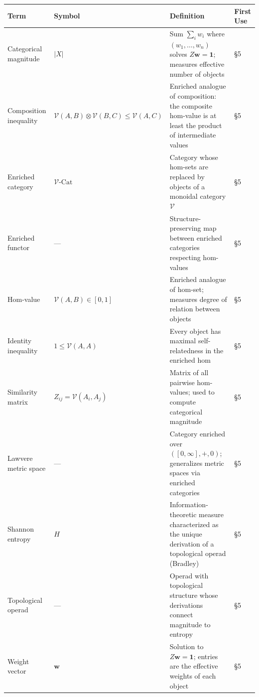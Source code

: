 \documentclass[
]{article}
\newcounter{none} %
\numberwithin{equation}{section}
\begin{document}
{\def\LTcaptype{none} %
\begin{longtable}[]{@{}
  >{\raggedright\arraybackslash}p{}
  >{\centering\arraybackslash}p{}
  >{\raggedright\arraybackslash}p{}
  >{\centering\arraybackslash}p{}@{}}
\toprule\noalign{}
\begin{minipage}[b]{\linewidth}\raggedright
Term
\end{minipage} & \begin{minipage}[b]{\linewidth}\centering
Symbol
\end{minipage} & \begin{minipage}[b]{\linewidth}\raggedright
Definition
\end{minipage} & \begin{minipage}[b]{\linewidth}\centering
First Use
\end{minipage} \\
\midrule\noalign{}
\endhead
\bottomrule\noalign{}
\endlastfoot
Categorical magnitude & \(\lvert X \rvert\) & Sum \(\sum_i w_i\) where
\((w_1, \ldots, w_n)\) solves \(Z \mathbf{w} = \mathbf{1}\); measures
effective number of objects & §5 \\
Composition inequality &
\(\mathcal{V}(A,B) \otimes \mathcal{V}(B,C) \leq \mathcal{V}(A,C)\) &
Enriched analogue of composition: the composite hom-value is at least
the product of intermediate values & §5 \\
Enriched category & \(\mathcal{V}\text{-Cat}\) & Category whose hom-sets
are replaced by objects of a monoidal category \(\mathcal{V}\) & §5 \\
Enriched functor & --- & Structure-preserving map between enriched
categories respecting hom-values & §5 \\
Hom-value & \(\mathcal{V}(A,B) \in [0,1]\) & Enriched analogue of
hom-set; measures degree of relation between objects & §5 \\
Identity inequality & \(1 \leq \mathcal{V}(A,A)\) & Every object has
maximal self-relatedness in the enriched hom & §5 \\
Similarity matrix & \(Z_{ij} = \mathcal{V}(A_i, A_j)\) & Matrix of all
pairwise hom-values; used to compute categorical magnitude & §5 \\
Lawvere metric space & --- & Category enriched over
\(([0,\infty], +, 0)\); generalizes metric spaces via enriched
categories & §5 \\
Shannon entropy & \(H\) & Information-theoretic measure characterized as
the unique derivation of a topological operad (Bradley) & §5 \\
Topological operad & --- & Operad with topological structure whose
derivations connect magnitude to entropy & §5 \\
Weight vector & \(\mathbf{w}\) & Solution to
\(Z\mathbf{w} = \mathbf{1}\); entries are the effective weights of each
object & §5 \\
\end{longtable}
}
\end{document}
